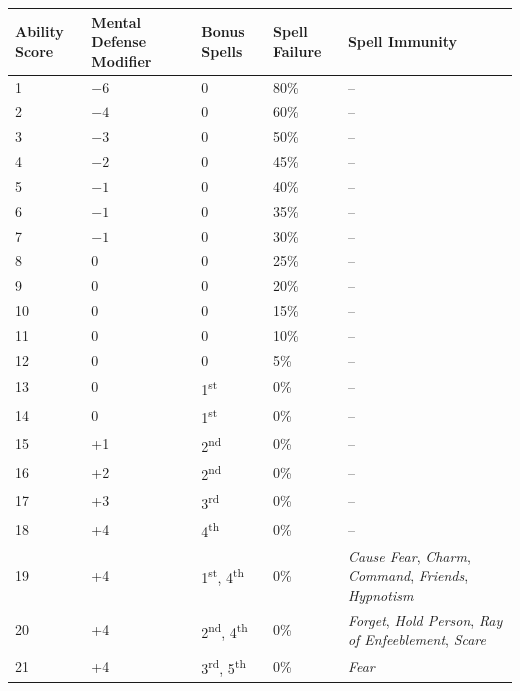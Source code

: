 
\noindent
\begin{minipage}{\columnwidth}

\label{wisdomscores}
\noindent
\begin{tabular}{|m{}|m{}|m{}|m{}|m{}|}
\hline
Ability Score	& Mental Defense Modifier	& Bonus Spells	& Spell Failure	& Spell Immunity \\
\hline\hline
\rowcolor[gray]{.9}1	& $-6$	& 0			& 80\%	& -- \\
2	& $-4$	& 0			& 60\%	& -- \\
\rowcolor[gray]{.9}3	& $-3$	& 0			& 50\%	& -- \\
4	& $-2$	& 0			& 45\%	& -- \\
\rowcolor[gray]{.9}5	& $-1$	& 0			& 40\%	& -- \\
6	& $-1$	& 0			& 35\%	& -- \\
\rowcolor[gray]{.9}7	& $-1$	& 0			& 30\%	& -- \\
8	& 0		& 0			& 25\%	& -- \\
\rowcolor[gray]{.9}9	& 0		& 0			& 20\%	& -- \\
10	& 0		& 0			& 15\%	& -- \\
\rowcolor[gray]{.9}11	& 0		& 0			& 10\%	& -- \\
12	& 0		& 0			& 5\%	& -- \\
\rowcolor[gray]{.9}13	& 0		& 1\textsuperscript{st}		& 0\%	& -- \\
14	& 0		& 1\textsuperscript{st}		& 0\%	& -- \\
\rowcolor[gray]{.9}15	& +1	& 2\textsuperscript{nd}		& 0\%	& -- \\
16	& +2	& 2\textsuperscript{nd}		& 0\%	& -- \\
\rowcolor[gray]{.9}17	& +3	& 3\textsuperscript{rd}		& 0\%	& -- \\
18	& +4	& 4\textsuperscript{th}		& 0\%	& -- \\
\rowcolor[gray]{.9}19	& +4	& 1\textsuperscript{st}, 4\textsuperscript{th}	& 0\%	& \textit{Cause Fear}, \textit{Charm}, \textit{Command}, \textit{Friends}, \textit{Hypnotism} \\
20	& +4	& 2\textsuperscript{nd}, 4\textsuperscript{th}	& 0\%	& \textit{Forget}, \textit{Hold Person}, \textit{Ray of Enfeeblement}, \textit{Scare} \\
\rowcolor[gray]{.9}21	& +4	& 3\textsuperscript{rd}, 5\textsuperscript{th}	& 0\%	& \textit{Fear} \\

\end{tabular}
\end{minipage}
